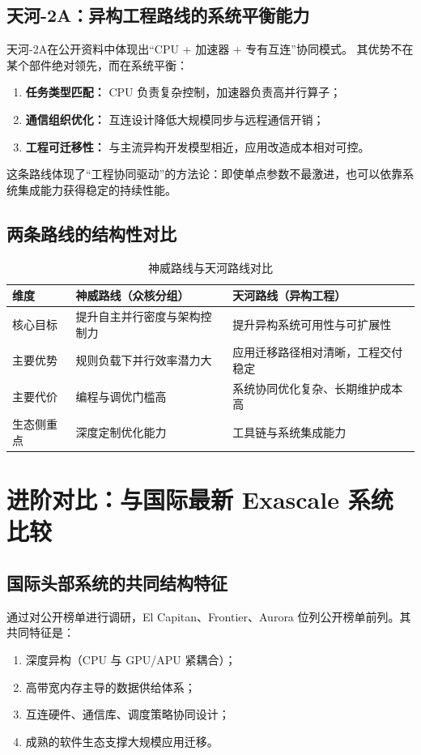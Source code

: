 \documentclass[12pt,a4paper]{article}
\begin{document}
\subsection{天河-2A：异构工程路线的系统平衡能力}
天河-2A在公开资料中体现出“CPU + 加速器 + 专有互连”协同模式\cite{top500-tianhe2a,liao2015-th-express}。  
其优势不在某个部件绝对领先，而在系统平衡：
\begin{enumerate}[leftmargin=2.5em]
  \item \textbf{任务类型匹配：} CPU 负责复杂控制，加速器负责高并行算子；
  \item \textbf{通信组织优化：} 互连设计降低大规模同步与远程通信开销；
  \item \textbf{工程可迁移性：} 与主流异构开发模型相近，应用改造成本相对可控。
\end{enumerate}
这条路线体现了“工程协同驱动”的方法论：即使单点参数不最激进，也可以依靠系统集成能力获得稳定的持续性能。

\subsection{两条路线的结构性对比}
\begin{table}[H]
  \centering
  \caption{神威路线与天河路线对比}
  \begin{tabularx}{\textwidth}{>{\raggedright\arraybackslash}p{2.5cm} >{\raggedright\arraybackslash}X >{\raggedright\arraybackslash}X}
    \toprule
    维度 & 神威路线（众核分组） & 天河路线（异构工程） \\
    \midrule
    核心目标 & 提升自主并行密度与架构控制力 & 提升异构系统可用性与可扩展性 \\
    主要优势 & 规则负载下并行效率潜力大 & 应用迁移路径相对清晰，工程交付稳定 \\
    主要代价 & 编程与调优门槛高 & 系统协同优化复杂、长期维护成本高 \\
    生态侧重点 & 深度定制优化能力 & 工具链与系统集成能力 \\
    \bottomrule
  \end{tabularx}
\end{table}

\section{进阶对比：与国际最新 Exascale 系统比较}
\subsection{国际头部系统的共同结构特征}
通过对公开榜单进行调研，El Capitan、Frontier、Aurora 位列公开榜单前列\cite{top500-2025-11,llnl-elcapitan,olcf-frontier,alcf-aurora}。其共同特征是：
\begin{enumerate}[leftmargin=2.5em]
  \item 深度异构（CPU 与 GPU/APU 紧耦合）；
  \item 高带宽内存主导的数据供给体系；
  \item 互连硬件、通信库、调度策略协同设计；
  \item 成熟的软件生态支撑大规模应用迁移。
\end{enumerate}
\end{document}
